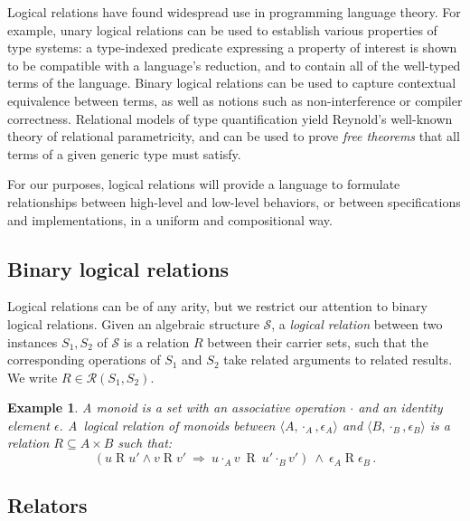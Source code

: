 \documentclass[11pt,oneside,draft]{book}
\newtheorem{example}[theorem]{Example}
\theoremstyle{definition}
\begin{document}
Logical relations have found widespread use in programming language theory.
For example,
unary logical relations can be used to establish
various properties of type systems:
a type-indexed predicate expressing a property of interest
is shown to be compatible with a language's reduction,
and to contain all of the well-typed terms of the language.
Binary logical relations can be used to capture
contextual equivalence between terms,
as well as notions such as non-interference or compiler correctness.
Relational models of type quantification yield
Reynold's well-known theory of relational parametricity,
and can be used to prove \emph{free theorems} that
all terms of a given generic type must satisfy.

For our purposes,
logical relations will provide a language to formulate
relationships between high-level and low-level behaviors,
or between specifications and implementations,
in a uniform and compositional way.


\subsection{Binary logical relations}

Logical relations can be of any arity,
but
we restrict our attention to
binary logical relations.
Given an algebraic structure $\mathcal{S}$,
a \emph{logical relation}
between two instances $S_1, S_2$ of $\mathcal{S}$
is a relation $R$
between their carrier sets,
such that the corresponding operations of $S_1$ and $S_2$
take related arguments to related results.
We write $R \in \mathcal{R}(S_1, S_2)$.

\begin{example}%
\label{ex:monoid}
A monoid is a set with
an associative operation $\cdot$ and
an identity element $\epsilon$.
A~\emph{logical relation of monoids} between
$\langle A, \cdot_A, \epsilon_A \rangle$ and
$\langle B, \cdot_B, \epsilon_B \rangle$
is a relation $R \subseteq A \times B$
such that:
\begin{equation}
\label{eqn:monoidrel}
(u \mathrel{R} u' \wedge v \mathrel{R} v' \: \Rightarrow \:
 u \cdot_A v \: \mathrel{R} \: u' \cdot_B v')
\: \wedge \:
\epsilon_A \mathrel{R} \epsilon_B \,.
\end{equation}
\end{example}

\subsection{Relators} \label{sec:relators}
\end{document}
